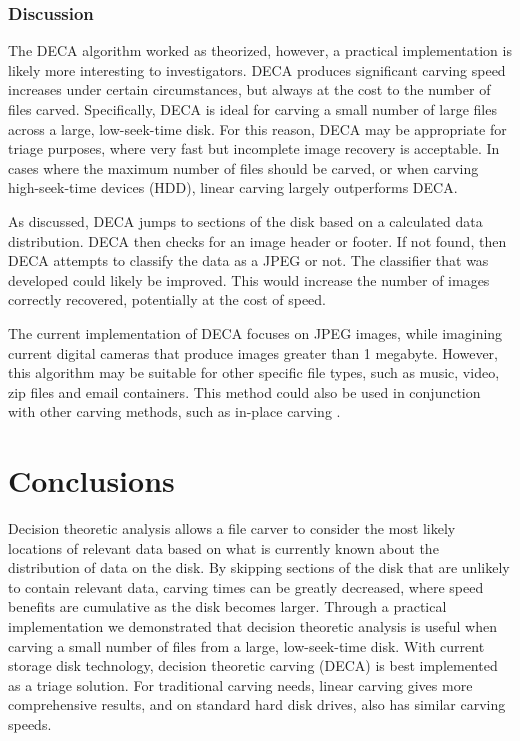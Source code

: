 \documentclass[final,5p,times,twocolumn,authoryear]{elsarticle}
\begin{document}
\subsubsection{Discussion}
The DECA algorithm worked as theorized, however, a practical implementation is likely more interesting to investigators. DECA produces significant carving speed increases under certain circumstances, but always at the cost to the number of files carved. Specifically, DECA is ideal for carving a small number of large files across a large, low-seek-time disk. For this reason, DECA may be appropriate for triage purposes, where very fast but incomplete image recovery is acceptable. In cases where the maximum number of files should be carved, or when carving high-seek-time devices (HDD), linear carving largely outperforms DECA.

As discussed, DECA jumps to sections of the disk based on a calculated data distribution. DECA then checks for an image header or footer. If not found, then DECA attempts to classify the data as a JPEG or not. The classifier that was developed could likely be improved. This would increase the number of images correctly recovered, potentially at the cost of speed.

The current implementation of DECA focuses on JPEG images, while imagining current digital cameras that produce images greater than 1 megabyte. However, this algorithm may be suitable for other specific file types, such as music, video, zip files and email containers. This method could also be used in conjunction with other carving methods, such as in-place carving \cite{Richard2007inplace, MeijerRob2012}.

\section{Conclusions}
Decision theoretic analysis allows a file carver to consider the most likely locations of relevant data based on what is currently known about the distribution of data on the disk. By skipping sections of the disk that are unlikely to contain relevant data, carving times can be greatly decreased, where speed benefits are cumulative as the disk becomes larger. Through a practical implementation we demonstrated that decision theoretic analysis is useful when carving a small number of files from a large, low-seek-time disk. With current storage disk technology, decision theoretic carving (DECA) is best implemented as a triage solution. For traditional carving needs, linear carving gives more comprehensive results, and on standard hard disk drives, also has similar carving speeds.
\end{document}
